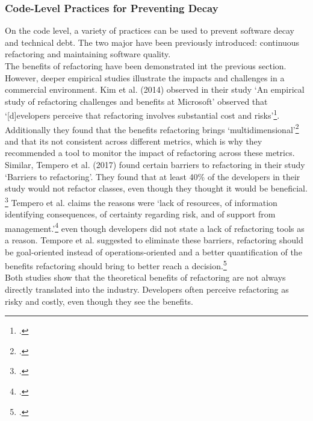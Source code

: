 \subsubsection{Code-Level Practices for Preventing Decay}
On the code level, a variety of practices can be used to prevent software decay and technical debt. The two major have been previously introduced: continuous refactoring and maintaining software quality.\\
The benefits of refactoring have been demonstrated int the previous section. However, deeper empirical studies illustrate the impacts and challenges in a commercial environment.
Kim et al. (2014) observed in their study `An empirical study of refactoring challenges and benefits at Microsoft' observed that `[d]evelopers perceive that refactoring involves substantial cost and risks'\footcite[17]{kimEmpiricalStudyRefactoringChallenges2014}.
Additionally they found that the benefits refactoring brings `multidimensional'\footcite[17]{kimEmpiricalStudyRefactoringChallenges2014} and that its not consistent across different metrics, which is why they recommended a tool to monitor the impact of refactoring across these metrics.
Similar, Tempero et al. (2017) found certain barriers to refactoring in their study `Barriers to refactoring'. They found that at least 40\% of the developers in their study would not refactor classes, even though they thought it would be beneficial. \footcite[60]{temperoBarriersRefactoring2017}
Tempero et al. claims the reasons were `lack of resources, of information identifying consequences, of certainty regarding risk, and of support from management.'\footcite[60]{temperoBarriersRefactoring2017} even though developers did not state a lack of refactoring tools as a reason.
Tempore et al. suggested to eliminate these barriers, refactoring should be goal-oriented instead of operations-oriented and a better quantification of the benefits refactoring should bring to better reach a decision.\footcite[61]{temperoBarriersRefactoring2017}\\
Both studies show that the theoretical benefits of refactoring are not always directly translated into the industry. Developers often perceive refactoring as risky and costly, even though they see the benefits.\\

